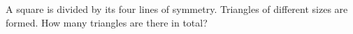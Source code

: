 A square is divided by its four lines of symmetry. Triangles of different sizes are formed. How many triangles are there in total?
